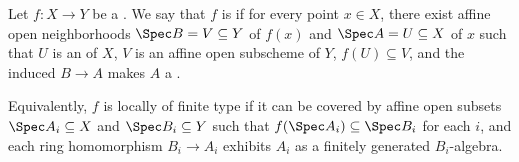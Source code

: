 \begin{definition} \label{definition:locally_of_finite_type_for_a_morphism_of_schemes}
    Let $f\colon X \to Y$ be a . We say that $f$ is  if for every point $x \in X$, there exist affine open neighborhoods $\Spec B = V \subseteq Y$ of $f(x)$ and $\Spec A = U \subseteq X$ of $x$ such that $U$ is an  of $X$, $V$ is an affine open subscheme of $Y$, $f(U) \subseteq V$, and the induced  $B \to A$ makes $A$ a .

    Equivalently, $f$ is locally of finite type if it can be covered by affine open subsets $\Spec A_i \subseteq X$ and $\Spec B_i \subseteq Y$ such that $f(\Spec A_i) \subseteq \Spec B_i$ for each $i$, and each ring homomorphism $B_i \to A_i$ exhibits $A_i$ as a finitely generated $B_i$-algebra.
\end{definition}
